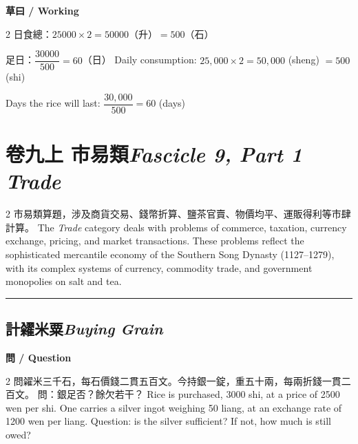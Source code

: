 \documentclass[11pt,a4paper]{article}
\newcommand{\bilingualsection}[2]{\section{#1\hfill\textit{\small #2}}}
\newcommand{\bilingualsubsection}[2]{\subsection{#1\quad\textit{#2}}}
\newcommand{\longline}{\noindent\rule{\textwidth}{0.4pt}}
\begin{document}
\vspace{0.4em}
\noindent\textbf{\textcolor{chinesecolor}{草曰} / \textcolor{englishcolor}{Working}}
\vspace{0.2em}
\begin{paracol}{2}
日食總：$25000 \times 2 = 50000$（升）$= 500$（石）

足日：$\dfrac{30000}{500} = 60$（日）
\switchcolumn
Daily consumption: $25{,}000 \times 2 = 50{,}000$ (sheng) $= 500$ (shi)

Days the rice will last: $\dfrac{30{,}000}{500} = 60$ (days)
\end{paracol}

\newpage


\bilingualsection{卷九上 \quad 市易類}{Fascicle 9, Part 1 \quad Trade}
\label{sec:fasc9a}

\begin{center}
\end{center}

\medskip

\begin{paracol}{2}
\textcolor{chinesecolor}{%
市易類算題，涉及商貨交易、錢幣折算、鹽茶官賣、物價均平、運販得利等市肆計算。
}
\switchcolumn
\textcolor{englishcolor}{%
The \textit{Trade} category deals with problems of commerce, taxation,
currency exchange, pricing, and market transactions. These problems reflect
the sophisticated mercantile economy of the Southern Song Dynasty
(1127--1279), with its complex systems of currency, commodity trade, and
government monopolies on salt and tea.
}
\end{paracol}

\vspace{0.8em}
\longline

\bilingualsubsection{計糴米粟}{Buying Grain}

\vspace{0.4em}
\noindent\textbf{\textcolor{chinesecolor}{問} / \textcolor{englishcolor}{Question}}
\vspace{0.3em}
\begin{paracol}{2}
問糴米三千石，每石價錢二貫五百文。今持銀一錠，重五十兩，每兩折錢一貫二百文。
問：銀足否？餘欠若干？
\switchcolumn
Rice is purchased, 3000 shi, at a price of 2500 wen per shi. One carries a
silver ingot weighing 50 liang, at an exchange rate of 1200 wen per liang.
Question: is the silver sufficient? If not, how much is still owed?
\end{paracol}
\end{document}

